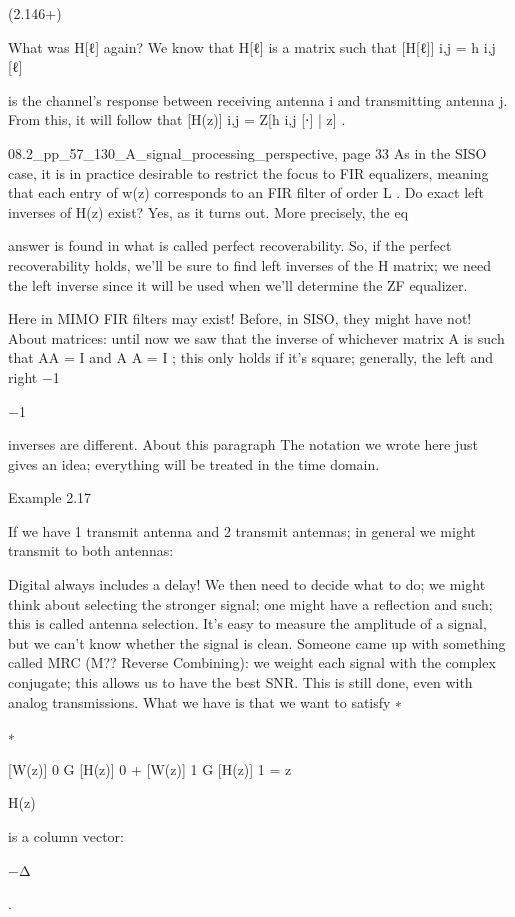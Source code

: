 {(2.146+)

​What was H[ℓ] again?
We know that H[ℓ] is a matrix such that
[H[ℓ]] i,j = h i,j [ℓ]

is the channel's response between receiving antenna i and transmitting antenna j.
From this, it will follow that
[H(z)] i,j = Z[h i,j [⋅] | z] .

08.2_pp_57_130_A_signal_processing_perspective, page 33 As in the SISO case, it is in practice desirable to restrict the focus to FIR equalizers, meaning that each entry of w(z) corresponds to an FIR filter of order L
. Do exact left inverses of H(z) exist? Yes, as it turns out. More precisely, the eq

answer is found in what is called perfect recoverability.
So, if the perfect recoverability holds, we'll be sure to find left inverses of the H matrix; we need the left inverse since it will be used when we'll determine the ZF equalizer.

Here in MIMO FIR filters may exist! Before, in SISO, they might have not!
About matrices: until now we saw that the inverse of whichever matrix A is such that AA
= I and A A = I ; this only holds if it's square; generally, the left and right
−1

−1

inverses are different.
​About this paragraph The notation we wrote here just gives an idea; everything will be treated in the time domain.

Example 2.17

If we have 1 transmit antenna and 2 transmit antennas; in general we might transmit to both antennas:

Digital always includes a delay!
We then need to decide what to do; we might think about selecting the stronger signal; one might have a reflection and such; this is called antenna selection.
It's easy to measure the amplitude of a signal, but we can't know whether the signal is clean.
Someone came up with something called MRC (M?? Reverse Combining): we weight each signal with the complex conjugate; this allows us to have the best SNR. This is still done, even with analog transmissions.
What we have is that we want to satisfy
∗

∗

[W(z)] 0 \sqrt G [H(z)] 0 + [W(z)] 1 \sqrt G [H(z)] 1 = z

H(z)

is a column vector:

−Δ

.

}
